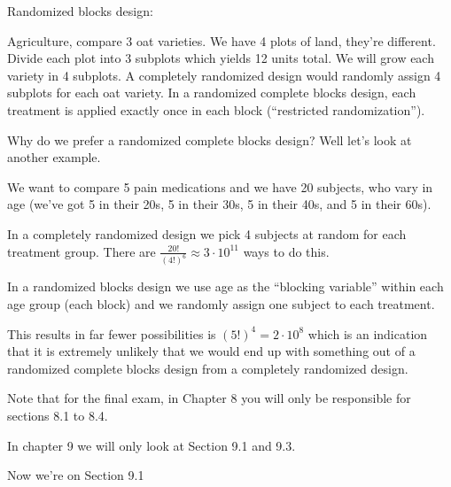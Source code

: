 \documentclass{article}
\begin{document}
Randomized blocks design:

Agriculture, compare 3 oat varieties. We have 4 plots of land, they're
different. Divide each plot into 3 subplots which yields 12 units total.  We
will grow each variety in 4 subplots. A completely randomized design would
randomly assign 4 subplots for each oat variety.  In a randomized complete blocks
design, each treatment is applied exactly once in each block (``restricted
randomization'').

Why do we prefer a randomized complete blocks design?
Well let's look at another example.

We want to compare 5 pain medications and we have 20 subjects, who vary in age
(we've got 5 in their 20s, 5 in their 30s, 5 in their 40s, and 5 in their 60s).

In a completely randomized design we pick 4 subjects at random for each treatment group. There are $\frac{20!}{\left( 4! \right)^6} \approx 3\cdot 10^{11}$ ways to do this.

In a randomized blocks design we use age as the ``blocking variable'' within each age group (each block) and we randomly assign one subject to each treatment.

This results in far fewer possibilities is $\left( 5! \right) ^4 = 2 \cdot
10^8$ which is an indication that it is extremely unlikely that we would end up
with something out of a randomized complete blocks design from a completely randomized
design.

Note that for the final exam, in Chapter 8 you will only be responsible for sections 8.1 to 8.4.

In chapter 9 we will only look at Section 9.1 and 9.3.

Now we're on Section 9.1
\end{document}
